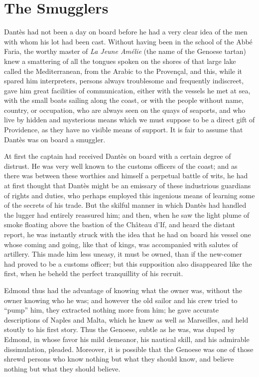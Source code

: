 \chapter{The Smugglers}

Dantès had not been a day on board before he had a very clear idea of
the men with whom his lot had been cast. Without having been in the
school of the Abbé Faria, the worthy master of \textit{La Jeune Amélie} (the
name of the Genoese tartan) knew a smattering of all the tongues spoken
on the shores of that large lake called the Mediterranean, from the
Arabic to the Provençal, and this, while it spared him interpreters,
persons always troublesome and frequently indiscreet, gave him great
facilities of communication, either with the vessels he met at sea,
with the small boats sailing along the coast, or with the people
without name, country, or occupation, who are always seen on the quays
of seaports, and who live by hidden and mysterious means which we must
suppose to be a direct gift of Providence, as they have no visible
means of support. It is fair to assume that Dantès was on board a
smuggler.

At first the captain had received Dantès on board with a certain degree
of distrust. He was very well known to the customs officers of the
coast; and as there was between these worthies and himself a perpetual
battle of wits, he had at first thought that Dantès might be an
emissary of these industrious guardians of rights and duties, who
perhaps employed this ingenious means of learning some of the secrets
of his trade. But the skilful manner in which Dantès had handled the
lugger had entirely reassured him; and then, when he saw the light
plume of smoke floating above the bastion of the Château d’If, and
heard the distant report, he was instantly struck with the idea that he
had on board his vessel one whose coming and going, like that of kings,
was accompanied with salutes of artillery. This made him less uneasy,
it must be owned, than if the new-comer had proved to be a customs
officer; but this supposition also disappeared like the first, when he
beheld the perfect tranquillity of his recruit.

Edmond thus had the advantage of knowing what the owner was, without
the owner knowing who he was; and however the old sailor and his crew
tried to “pump” him, they extracted nothing more from him; he gave
accurate descriptions of Naples and Malta, which he knew as well as
Marseilles, and held stoutly to his first story. Thus the Genoese,
subtle as he was, was duped by Edmond, in whose favor his mild
demeanor, his nautical skill, and his admirable dissimulation, pleaded.
Moreover, it is possible that the Genoese was one of those shrewd
persons who know nothing but what they should know, and believe nothing
but what they should believe.

